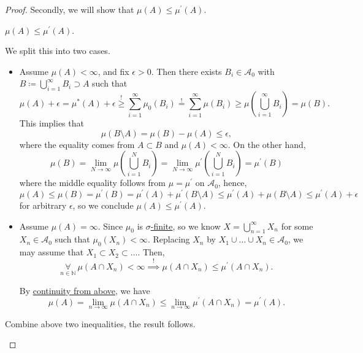 \begin{proof}
	Secondly, we will show that \(\mu (A)\leq \mu ^\prime (A)\).
	\begin{claim}
		\(\mu (A)\leq \mu ^\prime (A)\).
	\end{claim}
	\begin{explanation}
		We split this into two cases.
		\begin{itemize}
			\item \label{pf:uniqueness-of-HK-extension-2.i}Assume \(\mu (A)<\infty \), and fix \(\epsilon >0\). Then there exists \(B_{i}\in\mathcal{A} _0\) with \(B\coloneqq \bigcup\limits_{i=1}^{\infty} B_{i}\supset A\)
			      such that
			      \[
				      \mu (A)+\epsilon = \mu ^{\ast} (A) + \epsilon\overset{\hyperref[prop:outer-measure]{!}}{\geq} \sum\limits_{i=1}^{\infty} \mu _0(B_{i}) \overset{\hyperref[def:pre-measure-countable-additivity-within-the-algebra]{!}}{=} \sum\limits_{i=1}^{\infty} \mu (B_{i})\geq \mu \left(\bigcup\limits_{i=1}^{\infty} B_{i}\right) = \mu (B).
			      \]
			      This implies that
			      \[
				      \mu (B\setminus A) = \mu (B) - \mu (A)\leq \epsilon,
			      \]
			      where the equality comes from \(A\subset B\) and \(\mu (A)<\infty \). On the other hand,
			      \[
				      \mu (B) = \lim\limits_{N \to \infty} \mu \left(\bigcup\limits_{i=1}^{N} B_{i}\right) = \lim\limits_{N \to \infty} \mu ^\prime \left(\bigcup\limits_{i=1}^{N} B_{i}\right) = \mu ^\prime (B)
			      \]
			      where the middle equality follows from \(\mu  = \mu ^\prime \) on \(\mathcal{A} _0\), hence,
			      \[
				      \mu (A)\leq \mu (B) = \mu ^\prime (B) = \mu ^\prime (A)+\mu ^\prime (B\setminus A) \leq \mu ^\prime (A) + \mu (B\setminus A) \leq \mu ^\prime (A) + \epsilon
			      \]
			      for arbitrary \(\epsilon \), so we conclude \(\mu (A)\leq \mu ^\prime (A)\).
			\item Assume \(\mu (A) = \infty \). Since \(\mu _0\) is \hyperref[def:finite-measure]{\(\sigma \)-finite}, so we know \(X = \bigcup\limits_{n=1}^{\infty} X_{n}\) for some \(X_{n}\in\mathcal{A} _0\) such that
			      \(\mu _0(X_{n})<\infty\).  Replacing \(X_{n}\) by \(X_{1}\cup \dots \cup X_{n} \in\mathcal{A} _0\), we may assume that \(X_1 \subset X_2 \subset \dots\).
			      Then,
			      \[
				      \underset{n\in\mathbb{N} }{\forall}\ \mu (A \cap X_{n})<\infty\overset{\hyperref[pf:uniqueness-of-HK-extension-2.i]{!}}{\implies} \mu (A\cap X_{n})\leq \mu ^\prime (A\cap X_{n}).
			      \]

			      By \hyperref[thm:measure-space-continuity-from-above]{continuity from above}, we have
			      \[
				      \mu (A) = \lim\limits_{n \to \infty} \mu (A\cap X_{n})\leq \lim\limits_{n \to \infty} \mu ^\prime (A\cap X_{n}) = \mu ^\prime (A).
			      \]
		\end{itemize}
		Combine above two inequalities, the result follows.
	\end{explanation}
\end{proof}

